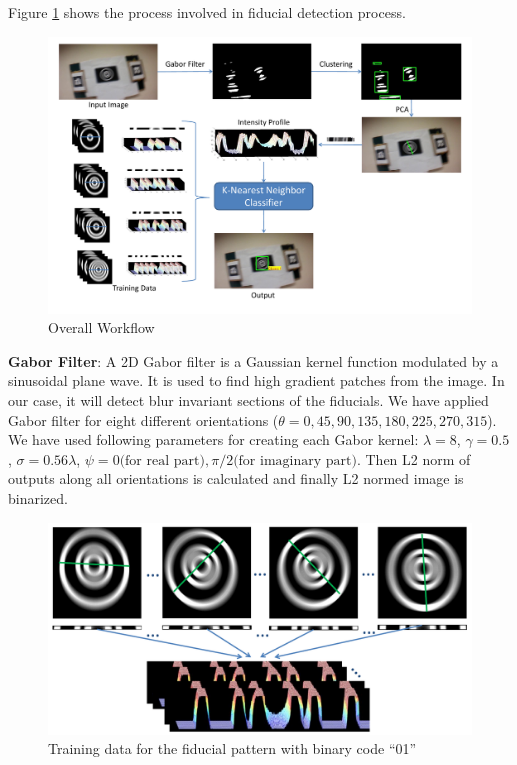 \documentclass[runningheads]{llncs}
\begin{document}
Figure \ref{fig:overall_flow} shows the process involved in fiducial detection
process.

\begin{figure}
\includegraphics[width=\linewidth]{overall_flow.pdf}
\caption{Overall Workflow}
\label{fig:overall_flow}
\end{figure}

\textbf{Gabor Filter}: A 2D Gabor filter is a Gaussian kernel function modulated
by a sinusoidal plane wave. It is used to find high gradient patches from the
image. In our case, it will detect blur invariant sections of the fiducials. We
have applied Gabor filter for eight different orientations ($\theta = 0, 45,
90, 135, 180, 225, 270, 315$). We have used following parameters for
creating each Gabor kernel: $\lambda = 8$, $\gamma = 0.5$, $\sigma =
0.56\lambda$, $\psi = 0 \text{(for real part)}, \pi/2 \text{(for imaginary
part)}$.
Then L2 norm of outputs along all orientations is calculated and finally L2
normed image is binarized.

\begin{figure}
\centering
  \includegraphics[width=\linewidth]{training_data.pdf}
  \caption{Training data for the fiducial pattern with binary code ``01''}
  \label{fig:training_data}
\end{figure}
\end{document}

